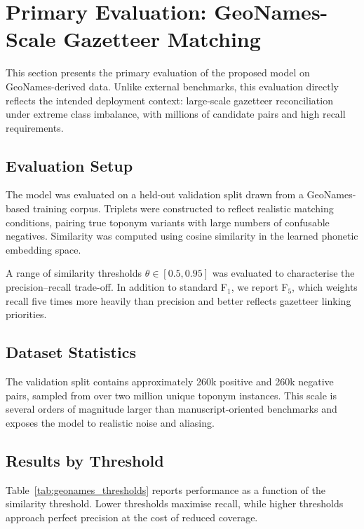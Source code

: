 
\section{Primary Evaluation: GeoNames-Scale Gazetteer Matching}

This section presents the primary evaluation of the proposed model on GeoNames-derived data.
Unlike external benchmarks, this evaluation directly reflects the intended deployment context:
large-scale gazetteer reconciliation under extreme class imbalance, with millions of candidate
pairs and high recall requirements.

\subsection{Evaluation Setup}

The model was evaluated on a held-out validation split drawn from a GeoNames-based training corpus.
Triplets were constructed to reflect realistic matching conditions, pairing true toponym variants
with large numbers of confusable negatives. Similarity was computed using cosine similarity in the
learned phonetic embedding space.

A range of similarity thresholds $\theta \in [0.5, 0.95]$ was evaluated to characterise the
precision--recall trade-off. In addition to standard F$_1$, we report F$_5$, which weights recall
five times more heavily than precision and better reflects gazetteer linking priorities.

\subsection{Dataset Statistics}

The validation split contains approximately 260k positive and 260k negative pairs, sampled from
over two million unique toponym instances. This scale is several orders of magnitude larger than
manuscript-oriented benchmarks and exposes the model to realistic noise and aliasing.

\subsection{Results by Threshold}

Table~\ref{tab:geonames_thresholds} reports performance as a function of the similarity threshold.
Lower thresholds maximise recall, while higher thresholds approach perfect precision at the cost
of reduced coverage.

